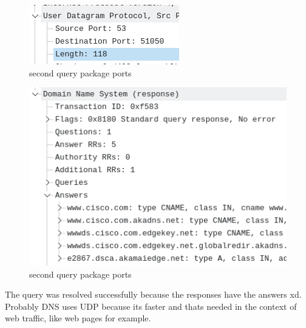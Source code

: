 \begin{figure}[htbp]
	\centering
	\includegraphics[width=1\linewidth]{img/11.png}
	\caption{second query package ports}\label{fig:11}
\end{figure}

\begin{figure}[htbp]
	\centering
	\includegraphics[width=1\linewidth]{img/12.png}
	\caption{second query package ports}\label{fig:12}
\end{figure}

The query was resolved successfully because the responses have the answers xd.
Probably DNS uses UDP because its faster and thats needed in the context of web
traffic, like web pages for example. \cite{rfc1034}
